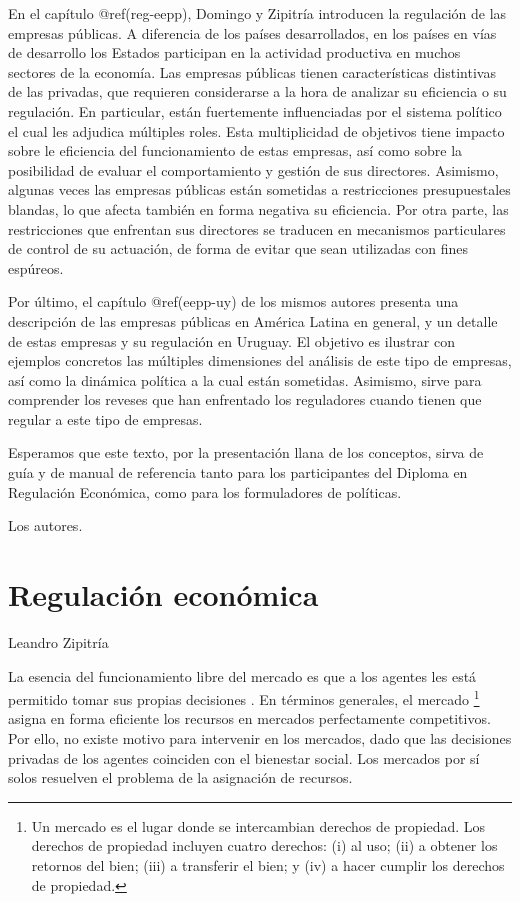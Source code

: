 \documentclass[
  12pt,
  spanish,
]{book}
\begin{document}
En el capítulo @ref(reg-eepp), Domingo y Zipitría introducen la
regulación de las empresas públicas. A diferencia de los países
desarrollados, en los países en vías de desarrollo los Estados
participan en la actividad productiva en muchos sectores de la economía.
Las empresas públicas tienen características distintivas de las
privadas, que requieren considerarse a la hora de analizar su eficiencia
o su regulación. En particular, están fuertemente influenciadas por el
sistema político el cual les adjudica múltiples roles. Esta
multiplicidad de objetivos tiene impacto sobre le eficiencia del
funcionamiento de estas empresas, así como sobre la posibilidad de
evaluar el comportamiento y gestión de sus directores. Asimismo, algunas
veces las empresas públicas están sometidas a restricciones
presupuestales blandas, lo que afecta también en forma negativa su
eficiencia. Por otra parte, las restricciones que enfrentan sus
directores se traducen en mecanismos particulares de control de su
actuación, de forma de evitar que sean utilizadas con fines espúreos.

Por último, el capítulo @ref(eepp-uy) de los mismos autores presenta una
descripción de las empresas públicas en América Latina en general, y un
detalle de estas empresas y su regulación en Uruguay. El objetivo es
ilustrar con ejemplos concretos las múltiples dimensiones del análisis
de este tipo de empresas, así como la dinámica política a la cual están
sometidas. Asimismo, sirve para comprender los reveses que han
enfrentado los reguladores cuando tienen que regular a este tipo de
empresas.

Esperamos que este texto, por la presentación llana de los conceptos,
sirva de guía y de manual de referencia tanto para los participantes del
Diploma en Regulación Económica, como para los formuladores de
políticas.

Los autores.

\hypertarget{reg-ec}{%
\chapter{Regulación económica}\label{reg-ec}}

Leandro Zipitría

La esencia del funcionamiento libre del mercado es que a los agentes les
está permitido tomar sus propias decisiones \citep[357]{Viscusi2005}. En
términos generales, el mercado \footnote{Un mercado es el lugar donde se
  intercambian derechos de propiedad. Los derechos de propiedad incluyen
  cuatro derechos: (i) al uso; (ii) a obtener los retornos del bien;
  (iii) a transferir el bien; y (iv) a hacer cumplir los derechos de
  propiedad.} asigna en forma eficiente los recursos en mercados
perfectamente competitivos. Por ello, no existe motivo para intervenir
en los mercados, dado que las decisiones privadas de los agentes
coinciden con el bienestar social. Los mercados por sí solos resuelven
el problema de la asignación de recursos.
\end{document}
